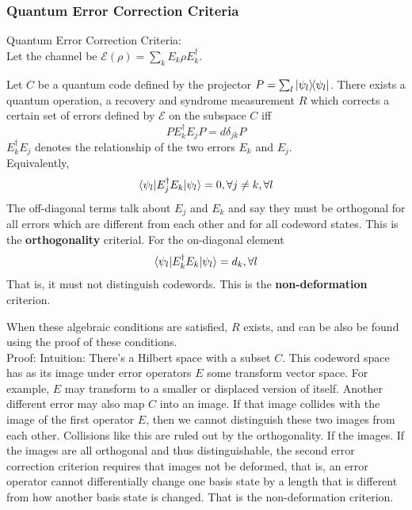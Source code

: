 \subsubsection{Quantum Error Correction Criteria}
Quantum Error Correction Criteria:\\
Let the channel be $\mathcal{E}(\rho) = \sum_k E_k \rho E_k^\dagger$. 
\begin{theorem}
    Let $C$ be a quantum code defined by the projector $P = \sum_l \ketbra{\psi_l}$. There exists a quantum operation, a recovery and syndrome measurement $R$ which corrects a certain set of errors defined by $\mathcal{E}$ on the subspace $C$ iff 
    \begin{equation}
        PE_k^\dagger E_j P = d \delta_{jk} P
    \end{equation}
    $E_k^\dagger E_j $ denotes the relationship of the two errors $E_k$ and $E_j$. \\
    Equivalently, 
    \begin{equation}
        \braket{\psi_l|E_j^\dagger E_k|\psi_l} = 0, \forall j \neq k, \forall l 
    \end{equation}
    The off-diagonal terms talk about $E_j$ and $E_k$ and say they must be orthogonal for all errors which are different from each other and for all codeword states. This is the \textbf{orthogonality} criterial. For the on-diagonal element 
    \begin{equation}
        \braket{\psi_l|E_k^\dagger E_k|\psi_l} = d_k, \forall l
    \end{equation}
    That is, it must not distinguish codewords. This is the \textbf{non-deformation} criterion. 
\end{theorem}
When these algebraic conditions are satisfied, $R$ exists, and can be also be found using the proof of these conditions. \\
Proof: Intuition: There's a Hilbert space with a subset $C$. This codeword space has as its image under error operators $E$ some transform vector space. For example, $E$ may transform to a smaller or displaced version of itself. Another different error may also map $C$ into an image. If that image collides with the image of the first operator $E$, then we cannot distinguish these two images from each other. Collisions like this are ruled out by the orthogonality. If the images. If the images are all orthogonal and thus distinguishable, the second error correction criterion requires that images not be deformed, that is, an error operator cannot differentially change one basis state by a length that is different from how another basis state is changed. That is the non-deformation criterion. \\

